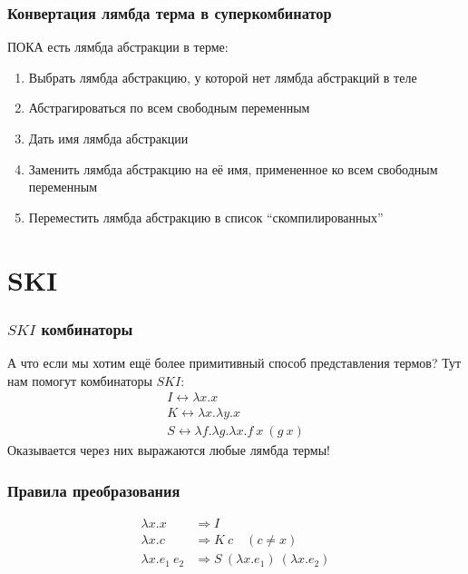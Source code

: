 \begin{frame}
    \frametitle{Конвертация лямбда терма в суперкомбинатор}

    ПОКА есть лямбда абстракции в терме:
    \begin{enumerate}
        \item Выбрать лямбда абстракцию, у которой нет лямбда абстракций в теле
        \item Абстрагироваться по всем свободным переменным
        \item Дать имя лямбда абстракции
        \item Заменить лямбда абстракцию на её имя, примененное ко всем свободным переменным
        \item Переместить лямбда абстракцию в список \enquote{скомпилированных}
    \end{enumerate}

\end{frame}

\section{SKI}

\begin{frame}
    \frametitle{$SKI$ комбинаторы}

    А что если мы хотим ещё более примитивный способ представления термов?
    Тут нам помогут комбинаторы $SKI$:
    \begin{gather*}
        I \leftrightarrow \lambda x. x \\
        K \leftrightarrow \lambda x. \lambda y. x \\
        S \leftrightarrow \lambda f. \lambda g. \lambda x. f\ x\ (g\ x)
    \end{gather*}
    Оказывается через них выражаются любые лямбда термы!
\end{frame}

\begin{frame}
    \frametitle{Правила преобразования}

    \begin{align*}
        \lambda x.x        & \Rightarrow I                                    \\
        \lambda x.c        & \Rightarrow K\ c\quad (c \neq x)                 \\
        \lambda x.e_1\ e_2 & \Rightarrow S\ (\lambda x.e_1)\ (\lambda x. e_2)
    \end{align*}

\end{frame}

